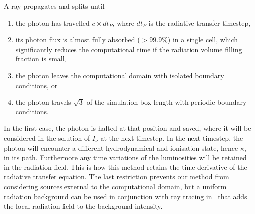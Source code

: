 \documentclass[useAMS,usenatbib]{mn2e}
\begin{document}
A ray propagates and splits until 
%
\begin{enumerate}
\item the photon has travelled $c \times dt_P$, where $dt_P$ is the
  radiative transfer timestep,
\item its photon flux is almost fully absorbed ($>99.9\%$) in a single
  cell, which significantly reduces the computational time if the
  radiation volume filling fraction is small,
\item the photon leaves the computational domain with isolated
  boundary conditions, or
\item the photon travels $\sqrt{3}$ of the simulation box length with
  periodic boundary conditions.
\end{enumerate}
%
In the first case, the photon is halted at that position and saved,
where it will be considered in the solution of $I_\nu$ at the next
timestep.  In the next timestep, the photon will encounter a different
hydrodynamical and ionisation state, hence $\kappa$, in its path.
Furthermore any time variations of the luminosities will be retained
in the radiation field.  This is how this method retains the time
derivative of the radiative transfer equation.  The last restriction
prevents our method from considering sources external to the
computational domain, but a uniform radiation background can be used
in conjunction with ray tracing in \moray~that adds the local
radiation field to the background intensity.


\end{document}
